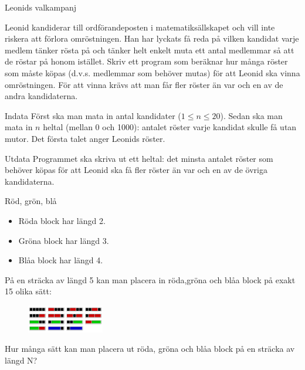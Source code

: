 \documentclass[10pt]{beamer}
\begin{document}
\begin{frame}{Leonids valkampanj}

Leonid kandiderar till ordförandeposten i matematiksällskapet och vill inte riskera att förlora omröstningen. Han har lyckats få reda på vilken kandidat varje medlem tänker rösta på och tänker helt enkelt muta ett antal medlemmar så att de röstar på honom istället. Skriv ett program som beräknar hur många röster som måste köpas (d.v.s. medlemmar som behöver mutas) för att Leonid ska vinna omröstningen. För att vinna krävs att man får fler röster än var och en av de andra kandidaterna.

\begin{exampleblock}{Indata}
Först ska man mata in antal kandidater ($1 \le n \le 20$). Sedan ska man mata in $n$ heltal (mellan 0 och 1000): antalet röster varje kandidat skulle få utan mutor. Det första talet anger Leonids röster.
\end{exampleblock}

\begin{exampleblock}{Utdata}
Programmet ska skriva ut ett heltal: det minsta antalet röster som behöver köpas för att Leonid ska få fler röster än var och en av de övriga kandidaterna.
\end{exampleblock}

\end{frame}




\begin{frame}{Röd, grön, blå}
\begin{itemize}
\item Röda block har längd 2.
\item Gröna block har längd 3.
\item Blåa block har längd 4.
\end{itemize}

På en sträcka av längd 5 kan man placera in röda,gröna och blåa block på exakt 15 olika sätt:

\begin{figure}[!ht]
\centering
\includegraphics[width=0.3\textwidth]{blarodgron}
\label{fig:bocker}
\end{figure}


Hur många sätt kan man placera ut röda, gröna och blåa block på en sträcka av längd N?
\end{frame}
\end{document}
